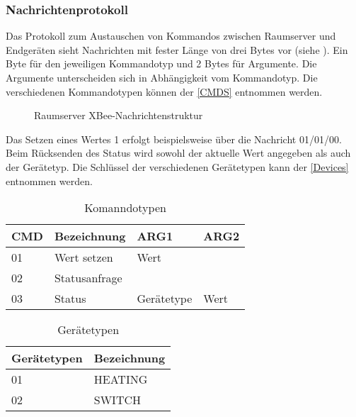 \subsubsection{Nachrichtenprotokoll}\label{Protokoll}
Das Protokoll zum Austauschen von Kommandos zwischen Raumserver und Endgeräten sieht Nachrichten mit fester Länge von drei Bytes vor (siehe ). Ein Byte für den jeweiligen Kommandotyp und 2 Bytes für Argumente. Die Argumente unterscheiden sich in Abhängigkeit vom Kommandotyp. Die verschiedenen Kommandotypen können der \autoref{CMDS} entnommen werden. 



\begin{figure}[H]
\centering
{}
\caption{Raumserver XBee-Nachrichtenstruktur}
\label{fig:Frame}
\end{figure}

Das Setzen eines Wertes 1 erfolgt beispielsweise über die Nachricht 01/01/00. Beim Rücksenden des Status wird sowohl der aktuelle Wert angegeben als auch der Gerätetyp. Die Schlüssel der verschiedenen Gerätetypen kann der \autoref{Devices} entnommen werden.


\begin{table}[]
\centering
\begin{tabular}{|l|l|l|l|}
\hline
\textbf{CMD} & \textbf{Bezeichnung} & \textbf{ARG1} & \textbf{ARG2} \\ \hline
01            & Wert setzen          & Wert          &               \\ \hline
02            & Statusanfrage        &               &               \\ \hline
03            & Status               & Gerätetype    & Wert          \\ \hline
\end{tabular}
\caption{Komanndotypen}
\label{CMDS}
\end{table}
\begin{table}[]
\centering
\begin{tabular}{|l|l|}
\hline
\textbf{Gerätetypen} & \textbf{Bezeichnung} \\ \hline
01                    & HEATING           \\ \hline
02                    & SWITCH             \\ \hline
\end{tabular}
\caption{Gerätetypen}
\label{Devices}
\end{table}

